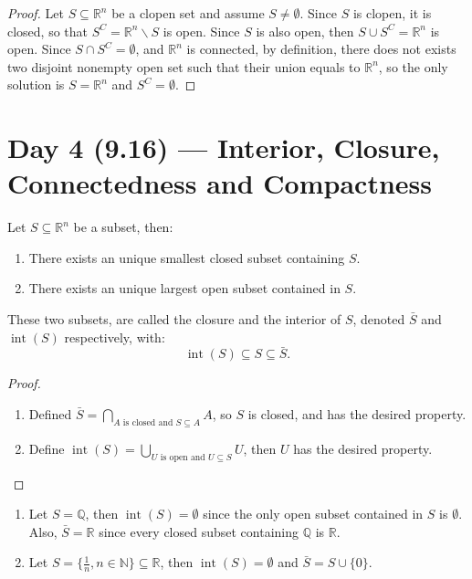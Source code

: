 \documentclass[11pt]{article}
\newenvironment{theorem}[1]{\begin{thmbox}{#1}{}}{\end{thmbox}}
\newenvironment{example}[1]{\begin{exbox}{#1}{}}{\end{exbox}}
\theoremstyle{quiet}
\theoremstyle{quietremark}
\begin{document}
\begin{proof}
Let $S\subseteq\mathbb{R}^n$ be a clopen set and assume $S\neq\emptyset$.  Since $S$ is clopen, it is closed, so that $S^C=\mathbb{R}^n\backslash S$ is open. Since $S$ is also open, then $S\cup S^C=\mathbb{R}^n$ is open. Since $S\cap S^C=\emptyset$, and $\mathbb{R}^n$ is connected, by definition, there does not exists two disjoint nonempty open set such that their union equals to $\mathbb{R}^n$, so the only solution is $S=\mathbb{R}^n$ and $S^C=\emptyset$. 
\end{proof}
\newpage

\section{Day 4 (9.16) --- Interior, Closure, Connectedness and Compactness}
\begin{theorem}
Let $S\subseteq\mathbb{R}^n$ be a subset, then:
\begin{enumerate}
\item There exists an unique smallest closed subset containing $S$.
\item There exists an unique largest open subset contained in $S$.
\end{enumerate}
These two subsets, are called the closure and the interior of $S$, denoted $\bar S$ and $\operatorname{int} (S)$ respectively, with:
\[
\operatorname{int}(S)\subseteq S\subseteq \bar S.
\]
\end{theorem}

\begin{proof}
\begin{enumerate}
\item Defined $\bar S=\bigcap_{A \text{ is closed and }S\subseteq A}A$, so $S$ is closed, and has the desired property.
\item Define $\operatorname{int}(S)=\bigcup_{U \text{ is open and }U\subseteq S}U$, then $U$ has the desired property.
\end{enumerate}
\end{proof}

\begin{example}{}
\begin{enumerate}
\item Let $S=\mathbb{Q}$, then $\operatorname{int}(S)=\emptyset$ since the only open subset contained in $S$ is $\emptyset$. Also, $\bar S=\mathbb{R}$ since every closed subset containing $\mathbb{Q}$ is $\mathbb{R}$.
\item Let $S=\{\frac{1}{n}, n\in\mathbb{N}\}\subseteq\mathbb{R}$, then $\operatorname{int}(S)=\emptyset$ and $\bar S=S\cup\{0\}$.
\end{enumerate}
\end{example}
\end{document}
